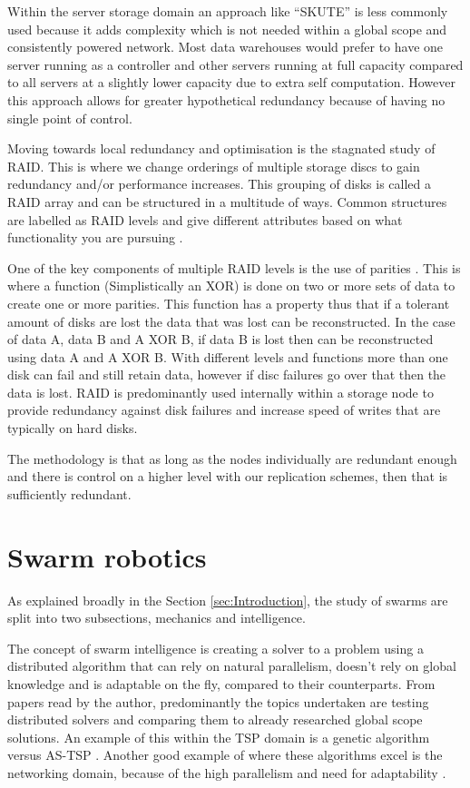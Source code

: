 \documentclass{UoYCSproject}
\begin{document}
Within the server storage  domain an approach like “SKUTE” is less commonly used because it adds complexity which is not needed within a global scope and consistently powered network.
Most data warehouses would prefer to have one server running as a controller and other servers running at full capacity compared to all servers at a slightly lower capacity due to extra self computation.
However this approach allows for greater hypothetical redundancy because of having no single point of control.

Moving towards local redundancy and optimisation is the stagnated study of RAID.
This is where we change orderings of multiple storage discs to gain redundancy and/or performance increases.
This grouping of disks is called a RAID array and can be structured in a multitude of ways.
Common structures are labelled as RAID levels and give different attributes based on what functionality you are pursuing \cite{RAID Levels}.

One of the key components of multiple RAID levels is the use of parities \cite{Raid parity}.
This is where a function (Simplistically an XOR) is done on two or more sets of data to create one or more parities.
This function has a property thus that if a tolerant amount of disks are lost the data that was lost can be reconstructed.
In the case of data A, data B and A XOR B, if data B is lost then can be reconstructed using data A and A XOR B.
With different levels and functions more than one disk can fail and still retain data, however if disc failures go over that then the data is lost.
RAID is predominantly used internally within a storage node to provide redundancy against disk failures and increase speed of writes that are typically on hard disks.

The methodology is that as long as the nodes individually are redundant enough and there is control on a higher level with our replication schemes, then that is sufficiently redundant.



\section{Swarm robotics}
\label{sec:Robotics}

As explained broadly in the Section \ref{sec:Introduction}, the study of swarms are split into two subsections, mechanics and intelligence.

The concept of swarm intelligence is creating a solver to a problem using a distributed algorithm that can rely on natural parallelism, doesn't rely on global knowledge and is adaptable on the fly, compared to their counterparts.
From papers read by the author, predominantly the topics undertaken are testing distributed solvers and comparing them to already researched global scope solutions.
An example of this within the TSP domain is a genetic algorithm versus AS-TSP \cite{Swarm intellegiegence}.
Another good example of where these algorithms excel is the networking domain, because of the high parallelism and need for adaptability \cite{Swarm intellegiegence}.
\end{document}
